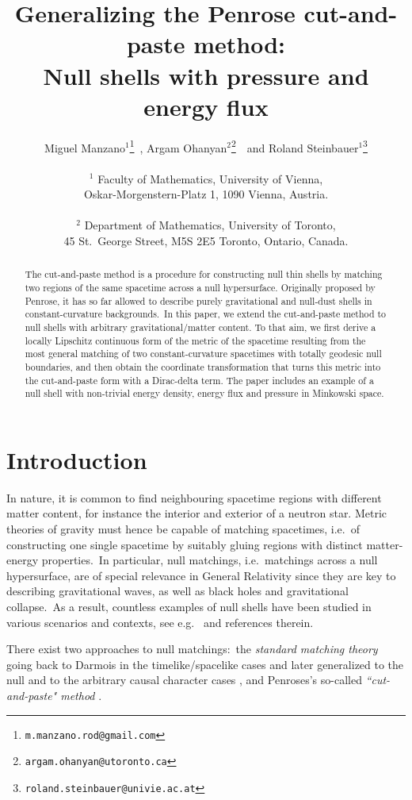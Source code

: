 \documentclass[11pt]{article}
\title{Generalizing the Penrose cut-and-paste method:\\ Null shells with pressure and energy flux
}
\author{
	Miguel Manzano$^1$\thanks{{\tt m.manzano.rod@gmail.com}}\ ,
	Argam Ohanyan$^2$\thanks{{\tt argam.ohanyan@utoronto.ca}}\ \ and Roland Steinbauer$^1$\thanks{{\tt roland.steinbauer@univie.ac.at}} \\ \\
	$^1$ Faculty of Mathematics, University of Vienna, \\
	Oskar-Morgenstern-Platz 1, 1090 Vienna, Austria. \\ \\
    $^2$ Department of Mathematics, University of Toronto,\\ 45 St.\ George Street, M5S 2E5 Toronto, Ontario, Canada. 
}
\numberwithin{equation}{section}
\begin{document}
\maketitle

\begin{abstract}
The cut-and-paste method is a procedure for constructing null thin shells by matching two regions of the same spacetime across a null hypersurface. Originally proposed by Penrose, it has so far allowed to describe purely gravitational and null-dust shells  in constant-curvature backgrounds.\ In this paper, we extend the cut-and-paste method to null shells with arbitrary gravitational/matter content. To that aim, we first derive a locally Lipschitz continuous form of the metric of the spacetime resulting from the most general matching of two constant-curvature spacetimes with totally geodesic null boundaries, and then obtain the coordinate transformation that turns this metric into the cut-and-paste form with a Dirac-delta term. The paper includes an example of a null shell with non-trivial energy density, energy flux and pressure in Minkowski space.
\end{abstract}

\tableofcontents

\section{Introduction}\label{sec:intro}


In nature, it is common to find neighbouring spacetime regions with different matter content, for instance the interior and exterior of a neutron star. Metric theories of gravity must hence be capable of matching spacetimes, i.e.\ of constructing one single spacetime by suitably gluing regions with distinct matter-energy properties.\ In particular, null matchings, i.e.\ matchings across a null hypersurface, are of special relevance in General Relativity 
since they are key to describing gravitational waves, as well as black holes and gravitational collapse.\ 
As a result, countless examples of null shells have been studied in various scenarios and contexts, see e.g.\ \cite{barrabes2003singular, khakshournia2023art, poisson2004relativist} and references therein.  
\medskip

There exist two approaches to null matchings:\ 
the \textit{standard matching theory} going back to Darmois \cite{darmois1927memorial} in the timelike/spacelike cases and later generalized to the null \cite{barrabes1991thin}
and to the arbitrary causal character cases  \cite{mars2007lorentzian,mars1993geometry}, and
Penroses's so-called \textit{``cut-and-paste" method} \cite{Penrose:1972xrn}.
\medskip
\end{document}
